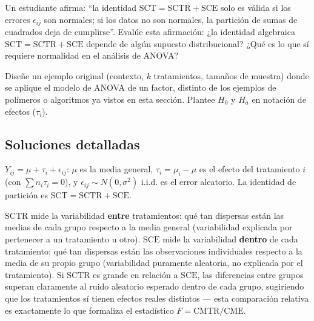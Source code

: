 \begin{problema}
	\label{prob:792b2ff}
	Un estudiante afirma: ``la identidad $\text{SCT}=\text{SCTR}+\text{SCE}$ solo es válida si los errores $\epsilon_{ij}$ son normales; si los datos no son normales, la partición de sumas de cuadrados deja de cumplirse''. Evalúe esta afirmación: ¿la identidad algebraica $\text{SCT}=\text{SCTR}+\text{SCE}$ depende de algún supuesto distribucional? ¿Qué es lo que sí requiere normalidad en el análisis de ANOVA?
\end{problema}

\begin{problema}
	\label{prob:4e06b95}
	Diseñe un ejemplo original (contexto, $k$ tratamientos, tamaños de muestra) donde se aplique el modelo de ANOVA de un factor, distinto de los ejemplos de polímeros o algoritmos ya vistos en esta sección. Plantee $H_0$ y $H_a$ en notación de efectos ($\tau_i$).
\end{problema}

\subsection*{Soluciones detalladas}

\begin{solproblema}[prob:04f6e1c]
	$Y_{ij}=\mu+\tau_i+\epsilon_{ij}$: $\mu$ es la media general, $\tau_i=\mu_i-\mu$ es el efecto del tratamiento $i$ (con $\sum n_i\tau_i=0$), y $\epsilon_{ij}\sim N(0,\sigma^2)$ i.i.d. es el error aleatorio. La identidad de partición es $\text{SCT}=\text{SCTR}+\text{SCE}$.
\end{solproblema}

\begin{solproblema}
	$\text{SCTR}$ mide la variabilidad \textbf{entre} tratamientos: qué tan dispersas están las medias de cada grupo respecto a la media general (variabilidad explicada por pertenecer a un tratamiento u otro). $\text{SCE}$ mide la variabilidad \textbf{dentro} de cada tratamiento: qué tan dispersas están las observaciones individuales respecto a la media de su propio grupo (variabilidad puramente aleatoria, no explicada por el tratamiento). Si $\text{SCTR}$ es grande en relación a $\text{SCE}$, las diferencias entre grupos superan claramente al ruido aleatorio esperado dentro de cada grupo, sugiriendo que los tratamientos sí tienen efectos reales distintos — esta comparación relativa es exactamente lo que formaliza el estadístico $F=\text{CMTR}/\text{CME}$.
\end{solproblema}

